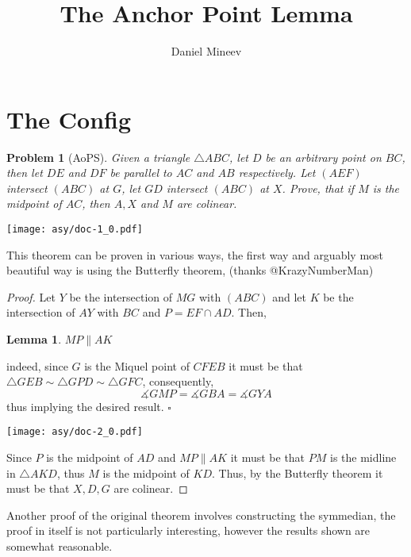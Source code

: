 \documentclass{article}
\title{The Anchor Point Lemma}
\author{Daniel Mineev}
\date{}
\newtheorem{problem}{Problem}
\newtheorem{lemma}{Lemma}
\begin{document}
\maketitle

\section{The Config}

\begin{problem}[AoPS]
  Given a triangle \(\triangle ABC\), let \(D\) be an arbitrary point on \(BC\), then let \(DE\) and \(DF\) be parallel to \(AC\) and \(AB\) respectively. Let \((AEF)\) intersect \((ABC)\) at \(G\), let \(GD\) intersect \((ABC)\) at \(X\). Prove, that if \(M\) is the midpoint of \(AC\), then \(A, X\) and \(M\) are colinear.
\end{problem}
\begin{center}
  \texttt{[image: asy/doc-1\_0.pdf]}
\end{center}

This theorem can be proven in various ways, the first way and arguably most beautiful way is using the Butterfly theorem, (thanks @KrazyNumberMan)

\begin{proof}
  Let \(Y\) be the intersection of \(MG\) with \((ABC)\) and let \(K\) be the intersection of \(AY\) with \(BC\) and \(P = EF \cap AD\). Then,
  \begin{lemma}
    \(MP \parallel AK\)
  \end{lemma}
  indeed, since \(G\) is the Miquel point of \(CFEB\) it must be that \(\triangle{GEB} \sim \triangle{GPD} \sim \triangle{GFC}\), consequently,
  \[\measuredangle GMP = \measuredangle GBA = \measuredangle GYA\]
  thus implying the desired result. \(\square\)
  \begin{center}
    \texttt{[image: asy/doc-2\_0.pdf]}
  \end{center}
  Since \(P\) is the midpoint of \(AD\) and \(MP \parallel AK\) it must be that \(PM\) is the midline in \(\triangle{AKD}\), thus \(M\) is the midpoint of \(KD\). Thus, by the Butterfly theorem it must be that \(X, D, G\) are colinear.
\end{proof}

Another proof of the original theorem involves constructing the symmedian, the proof in itself is not particularly interesting, however the results shown are somewhat reasonable.
\end{document}
